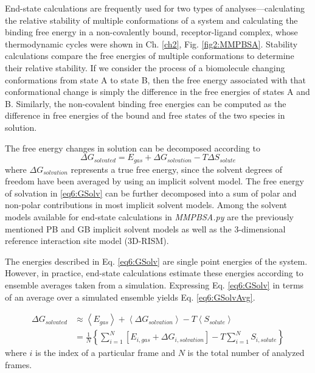 End-state calculations are frequently used for two types of
analyses---calculating the relative stability of multiple conformations of a
system and calculating the binding free energy in a non-covalently bound,
receptor-ligand complex, \cite{Homeyer2012} whose thermodynamic cycles were
shown in Ch. \ref{ch2}, Fig. \ref{fig2:MMPBSA}. Stability calculations compare
the free energies of multiple conformations to determine their relative
stability. If we consider the process of a biomolecule changing conformations
from state A to state B, then the free energy associated with that
conformational change is simply the difference in the free energies of states A
and B. Similarly, the non-covalent binding free energies can be computed as the
difference in free energies of the bound and free states of the two species in
solution.

The free energy changes in solution can be decomposed according to
\begin{equation}
   \Delta G_{solvated} = E_{gas} + \Delta G_{solvation} - T \Delta S_{solute}
   \label{eq6:GSolv}
\end{equation}
where $\Delta G_{solvation}$ represents a true free energy, since the solvent
degrees of freedom have been averaged by using an implicit solvent model. The
free energy of solvation in \ref{eq6:GSolv} can be further decomposed into a sum
of polar and non-polar contributions in most implicit solvent models. Among the
solvent models available for end-state calculations in \emph{MMPBSA.py} are the
previously mentioned PB and GB implicit solvent models as well as the
3-dimensional reference interaction site model (3D-RISM). \cite{Genheden2010}

The energies described in Eq. \ref{eq6:GSolv} are single point energies of the
system. However, in practice, end-state calculations estimate these energies
according to ensemble averages taken from a simulation. Expressing Eq.
\ref{eq6:GSolv} in terms of an average over a simulated ensemble yields Eq.
\ref{eq6:GSolvAvg}.

\begin{align}
   \Delta G_{solvated} & \approx \left \langle E_{gas} \right \rangle + \left
         \langle \Delta G_{solvation} \right \rangle - T \left \langle
         S_{solute} \right \rangle \nonumber \\
   & = \frac 1 N \left \lbrace \sum_{i=1}^N \left[E_{i,gas} + \Delta
         G_{i,solvation} \right] - T\sum_{i=1}^N S_{i,solute} \right \rbrace
   \label{eq6:GSolvAvg}
\end{align}
where $i$ is the index of a particular frame and $N$ is the total number of
analyzed frames.

